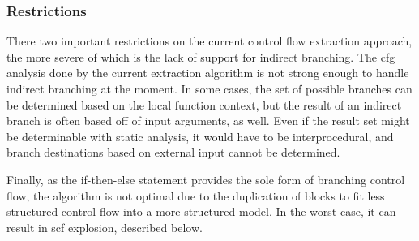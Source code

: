 \subsubsection{Restrictions}
There two important restrictions on the current control flow extraction approach,
the more severe of which is the lack of support for indirect branching.
The \ac{cfg} analysis done by the current extraction algorithm
is not strong enough to handle indirect branching at the moment.
In some cases, the set of possible branches can be determined based on the
local function context, but the result of an indirect branch is often based off of input arguments, as well. Even if the result set
might be determinable with static analysis, it would have to be interprocedural,
and branch destinations based on external input cannot be determined.

Finally, as the if-then-else statement provides the sole form of
branching control flow, the algorithm is not optimal
due to the duplication of blocks to fit less structured control flow
into a more structured model. In the worst case,
it can result in \ac{scf} explosion, described below.

